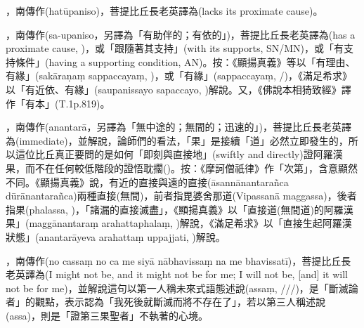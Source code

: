 \startitemgroup[noteitems]
\item{}，南傳作(hatūpaniso)，菩提比丘長老英譯為(lacks its proximate cause)。
\item{}，南傳作(sa-upaniso，另譯為「有助伴的；有依的」)，菩提比丘長老英譯為(has a proximate cause, )，或「跟隨著其支持」(with its supports, SN/MN)，或「有支持條件」(having a supporting condition, AN)。按：《顯揚真義》等以「有理由、有緣」(sakāraṇaṃ sappaccayaṃ, )，或「有緣」(sappaccayaṃ, /)，《滿足希求》以「有近依、有緣」(saupanissayo sapaccayo, )解說。又，《佛說本相猗致經》譯作「有本」(T.1p.819)。
\stopitemgroup

\startitemgroup[noteitems]
\item{}，南傳作(anantarā，另譯為「無中途的；無間的；迅速的」)，菩提比丘長老英譯為(immediate)，並解說，論師們的看法，「果」是接續「道」必然立即發生的，所以這位比丘真正要問的是如何「即刻與直接地」(swiftly and directly)證阿羅漢果，而不在任何較低階段的證悟耽擱()。按：《摩訶僧祇律》作「次第」，含意顯然不同。《顯揚真義》說，有近的直接與遠的直接(āsannānantarañca dūrānantarañca)兩種直接(無間)，前者指毘婆舍那道(Vipassanā maggassa)，後者指果(phalassa, )，「諸漏的直接滅盡」，《顯揚真義》以「直接道(無間道)的阿羅漢果」(maggānantaraṃ arahattaphalaṃ, )解說，《滿足希求》以「直接生起阿羅漢狀態」(anantarāyeva arahattaṃ uppajjati, )解說。
\stopitemgroup

\startitemgroup[noteitems]
\item{}，南傳作(no cassaṃ no ca me siyā nābhavissaṃ na me bhavissatī)，菩提比丘長老英譯為(I might not be, and it might not be for me; I will not be, [and] it will not be for me)，並解說這句以第一人稱未來式語態述說(assaṃ, ///)，是「斷滅論者」的觀點，表示認為「我死後就斷滅而將不存在了」，若以第三人稱述說(assa)，則是「證第三果聖者」不執著的心境。
\stopitemgroup

